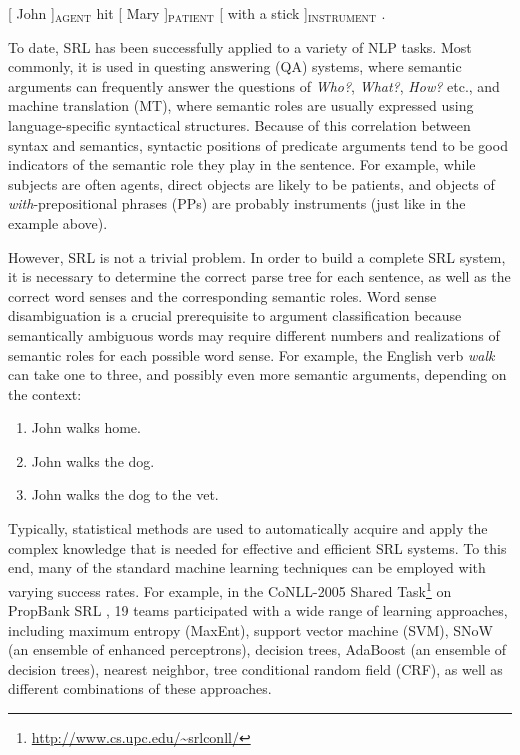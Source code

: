 \documentclass[a4paper,twoside,12pt]{article}
\begin{document}
\begin{center}
[ John ]$_{\text{AGENT}}$ hit [ Mary ]$_{\text{PATIENT}}$ [ with a stick ]$_{\text{INSTRUMENT}}$ . 
\end{center}

To date, SRL has been successfully applied to a variety of NLP tasks. Most commonly, it is used in questing answering (QA) systems, where semantic arguments can frequently answer the questions of \textit{Who?}, \textit{What?}, \textit{How?} etc., and machine translation (MT), where semantic roles are usually expressed using language-specific syntactical structures. Because of this correlation between syntax and semantics, syntactic positions of predicate arguments tend to be good indicators of the semantic role they play in the sentence. For example, while subjects are often agents, direct objects are likely to be patients, and objects of \textit{with}-prepositional phrases (PPs) are probably instruments (just like in the example above).

However, SRL is not a trivial problem. In order to build a complete SRL system, it is necessary to determine the correct parse tree for each sentence, as well as the correct word senses and the corresponding semantic roles. Word sense disambiguation is a crucial prerequisite to argument classification because semantically ambiguous words may require different numbers and realizations of semantic roles for each possible word sense. For example, the English verb \textit{walk} can take one to three, and possibly even more semantic arguments, depending on the context:

\begin{enumerate}
\item[(1)] John walks home.
\item[(2)] John walks the dog.
\item[(3)] John walks the dog to the vet.
\end{enumerate}

Typically, statistical methods are used to automatically acquire and apply the complex knowledge that is needed for effective and efficient SRL systems. To this end, many of the standard machine learning techniques can be employed with varying success rates. For example, in the CoNLL-2005 Shared Task\footnote{\url{http://www.cs.upc.edu/~srlconll/}} on PropBank SRL \citep{propbank}, 19 teams participated with a wide range of learning approaches, including maximum entropy (MaxEnt), support vector machine (SVM), SNoW (an ensemble of enhanced perceptrons), decision trees, AdaBoost (an ensemble of decision trees), nearest neighbor, tree conditional random field (CRF), as well as different combinations of these approaches.
\end{document}
